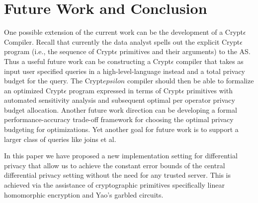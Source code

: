\section{Future Work and Conclusion}
One possible extension of the current work can be the development of a
Crypt$\epsilon$ Compiler. Recall that currently the data analyst spells out the explicit Crypt$\epsilon$ program  (i.e., the sequence of Crypt$\epsilon$ primitives and their arguments) to the AS. Thus a useful future work can be constructing a Crypt$\epsilon$ compiler that takes as input user specified queries in a high-level-language instead and a total privacy budget for the query. The Crypt$epsilon$
compiler should then be able to formalize an optimized Crypt$\epsilon$ program expressed in terms of Crypt$\epsilon$ primitives with automated sensitivity analysis and subsequent optimal per operator privacy budget allocation. 
Another future work direction can be developing a formal performance-accuracy trade-off framework for choosing the optimal privacy budgeting for optimizations. Yet another goal for future work is to support a larger class of queries like joins et al.
\par In this paper we have proposed a new implementation setting for differential privacy that allow us to achieve the constant error bounds of the central differential privacy setting without the need for any trusted server. This is achieved via the assistance of cryptographic primitives specifically linear homomorphic encryption and Yao's garbled circuits. 